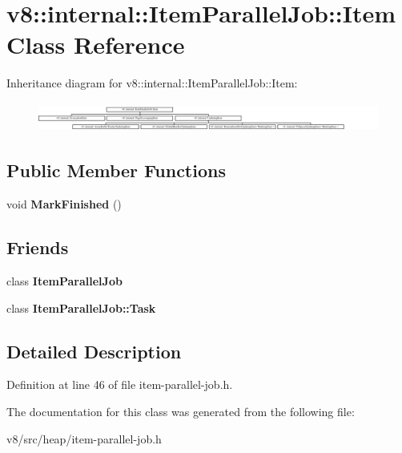 \hypertarget{classv8_1_1internal_1_1ItemParallelJob_1_1Item}{}\section{v8\+:\+:internal\+:\+:Item\+Parallel\+Job\+:\+:Item Class Reference}
\label{classv8_1_1internal_1_1ItemParallelJob_1_1Item}
Inheritance diagram for v8\+:\+:internal\+:\+:Item\+Parallel\+Job\+:\+:Item\+:\begin{figure}[H]
\begin{center}
\leavevmode
\includegraphics[height=0.965517cm]{classv8_1_1internal_1_1ItemParallelJob_1_1Item}
\end{center}
\end{figure}
\subsection*{Public Member Functions}
\begin{DoxyCompactItemize}
\item 
\mbox{\label{classv8_1_1internal_1_1ItemParallelJob_1_1Item_a18ca97765ade68bca82eea1853fb144a}} 
void {\bfseries Mark\+Finished} ()
\end{DoxyCompactItemize}
\subsection*{Friends}
\begin{DoxyCompactItemize}
\item 
\mbox{\label{classv8_1_1internal_1_1ItemParallelJob_1_1Item_a7673714c73e382f4c253b761c43ed0ed}} 
class {\bfseries Item\+Parallel\+Job}
\item 
\mbox{\label{classv8_1_1internal_1_1ItemParallelJob_1_1Item_ab8d7df56645b620cd06bc99cf4eab626}} 
class {\bfseries Item\+Parallel\+Job\+::\+Task}
\end{DoxyCompactItemize}


\subsection{Detailed Description}


Definition at line 46 of file item-\/parallel-\/job.\+h.



The documentation for this class was generated from the following file\+:\begin{DoxyCompactItemize}
\item 
v8/src/heap/item-\/parallel-\/job.\+h\end{DoxyCompactItemize}
